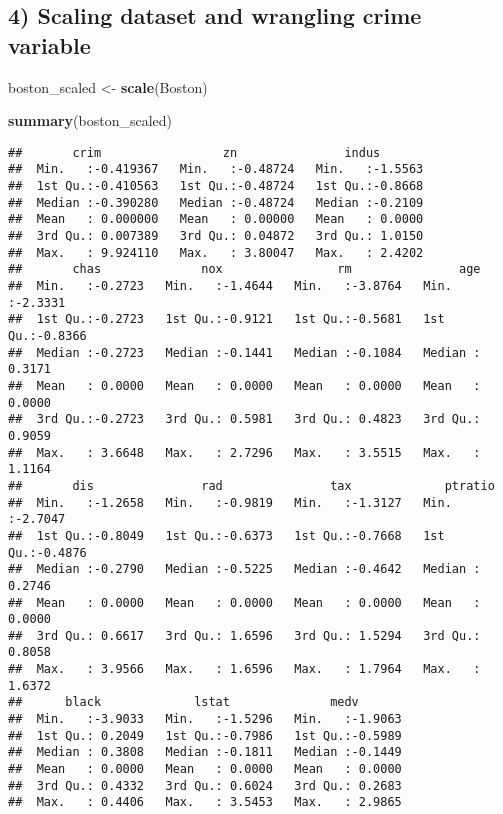 \documentclass[]{article}
\newenvironment{Shaded}{\begin{snugshade}}{\end{snugshade}}
\newcommand{\KeywordTok}[1]{\textcolor[rgb]{0.13,0.29,0.53}{\textbf{#1}}}
\newcommand{\StringTok}[1]{\textcolor[rgb]{0.31,0.60,0.02}{#1}}
\newcommand{\NormalTok}[1]{#1}
\begin{document}
\subsection{4) Scaling dataset and wrangling crime
variable}\label{scaling-dataset-and-wrangling-crime-variable}

\begin{Shaded}
\begin{Highlighting}[]
\NormalTok{boston_scaled <-}\StringTok{ }\KeywordTok{scale}\NormalTok{(Boston)}

\KeywordTok{summary}\NormalTok{(boston_scaled)}
\end{Highlighting}
\end{Shaded}

\begin{verbatim}
##       crim                 zn               indus        
##  Min.   :-0.419367   Min.   :-0.48724   Min.   :-1.5563  
##  1st Qu.:-0.410563   1st Qu.:-0.48724   1st Qu.:-0.8668  
##  Median :-0.390280   Median :-0.48724   Median :-0.2109  
##  Mean   : 0.000000   Mean   : 0.00000   Mean   : 0.0000  
##  3rd Qu.: 0.007389   3rd Qu.: 0.04872   3rd Qu.: 1.0150  
##  Max.   : 9.924110   Max.   : 3.80047   Max.   : 2.4202  
##       chas              nox                rm               age         
##  Min.   :-0.2723   Min.   :-1.4644   Min.   :-3.8764   Min.   :-2.3331  
##  1st Qu.:-0.2723   1st Qu.:-0.9121   1st Qu.:-0.5681   1st Qu.:-0.8366  
##  Median :-0.2723   Median :-0.1441   Median :-0.1084   Median : 0.3171  
##  Mean   : 0.0000   Mean   : 0.0000   Mean   : 0.0000   Mean   : 0.0000  
##  3rd Qu.:-0.2723   3rd Qu.: 0.5981   3rd Qu.: 0.4823   3rd Qu.: 0.9059  
##  Max.   : 3.6648   Max.   : 2.7296   Max.   : 3.5515   Max.   : 1.1164  
##       dis               rad               tax             ptratio       
##  Min.   :-1.2658   Min.   :-0.9819   Min.   :-1.3127   Min.   :-2.7047  
##  1st Qu.:-0.8049   1st Qu.:-0.6373   1st Qu.:-0.7668   1st Qu.:-0.4876  
##  Median :-0.2790   Median :-0.5225   Median :-0.4642   Median : 0.2746  
##  Mean   : 0.0000   Mean   : 0.0000   Mean   : 0.0000   Mean   : 0.0000  
##  3rd Qu.: 0.6617   3rd Qu.: 1.6596   3rd Qu.: 1.5294   3rd Qu.: 0.8058  
##  Max.   : 3.9566   Max.   : 1.6596   Max.   : 1.7964   Max.   : 1.6372  
##      black             lstat              medv        
##  Min.   :-3.9033   Min.   :-1.5296   Min.   :-1.9063  
##  1st Qu.: 0.2049   1st Qu.:-0.7986   1st Qu.:-0.5989  
##  Median : 0.3808   Median :-0.1811   Median :-0.1449  
##  Mean   : 0.0000   Mean   : 0.0000   Mean   : 0.0000  
##  3rd Qu.: 0.4332   3rd Qu.: 0.6024   3rd Qu.: 0.2683  
##  Max.   : 0.4406   Max.   : 3.5453   Max.   : 2.9865
\end{verbatim}
\end{document}
